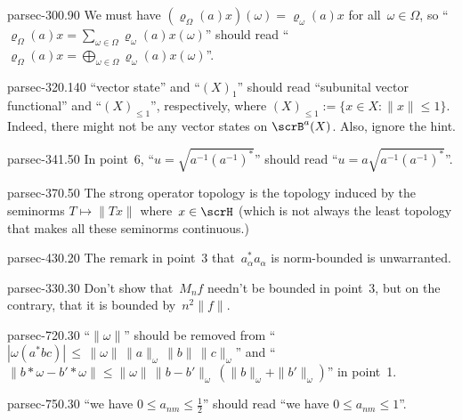 \documentclass[b5page]{book}
\begin{document}
\begin{erratum}{parsec-300.90}
We must have $(\varrho_\Omega(a)x)(\omega)
= \varrho_\omega(a)x$
for all~$\omega\in\Omega$,
so
``$\varrho_\Omega(a)x = \sum_{\omega\in\Omega}
\varrho_\omega(a)x(\omega)$''
should read
``$\varrho_\Omega(a)x = \bigoplus_{\omega\in\Omega}
\varrho_\omega(a)x(\omega)$''.
\end{erratum}
\begin{erratum}{parsec-320.140}
``vector state'' and ``$(X)_1$''
should read ``subunital vector functional''
and ``$(X)_{\leq 1}$'', respectively,
where $(X)_{\leq 1} := 
\{x\in X\colon \|x\|\leq 1\}$.
Indeed, there might
not be any vector states on $\scrB^a(X)$.
Also, ignore the hint.
\end{erratum}
\begin{erratum}{parsec-341.50}
In point~6, ``$u=\sqrt{a^{-1}(a^{-1})^*}$''
should read ``$u=a\sqrt{a^{-1}(a^{-1})^*}$''.
\end{erratum}
\begin{erratum}{parsec-370.50}
The strong operator topology is the topology
induced by the seminorms $T\mapsto \|Tx\|$ where~$x\in \scrH$
(which is not always the least topology that makes
all these seminorms continuous.)
\end{erratum}
\begin{erratum}{parsec-430.20}
The remark in point~3 that~$a_\alpha^*a_\alpha$
is norm-bounded is unwarranted.
\end{erratum}
\begin{erratum}{parsec-330.30}
Don't show that~$M_nf$ needn't be bounded
in point~3,
but on the contrary, that it is bounded by~$n^2\|f\|$.
\end{erratum}
\begin{erratum}{parsec-720.30}
``$\|\omega\|$''
should be removed
from
``$\left|\omega(a^*bc)\right|\,\leq\,
\|\omega\|\,\|a\|_\omega\,\|b\|\,\|c\|_\omega$''
and 
``$\|b\ast \omega-b'\ast \omega\|
\leq \|\omega\|\,\|b-b'\|_\omega\,(\|b\|_\omega+\|b'\|_\omega)$''
in point~1.
\end{erratum}
\begin{erratum}{parsec-750.30}
``we have $0\leq a_{nm}\leq \frac{1}{2}$''
should read ``we have $0\leq a_{nm}\leq 1$''.
\end{erratum}
\end{document}
